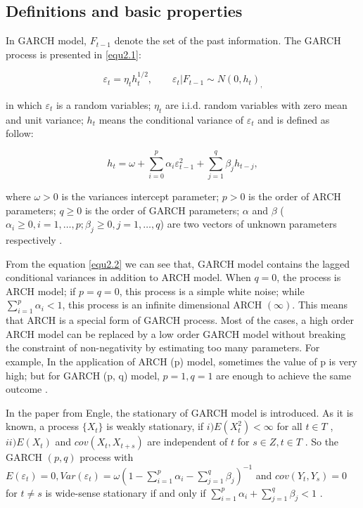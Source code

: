 \subsection{Definitions and basic properties}
In GARCH model, $F_{t-1}$ denote the set of the past information. The GARCH process is presented in \ref{equ2.1}:

\begin{equation} 
\label{equ2.1}
	\varepsilon_t =  \eta_t h_t^{1/2},    \qquad    \varepsilon_{t}|F_{t-1}\sim N(0,h_{t})_,
 \end{equation} 
 
in which $\varepsilon_t$ is a random variables; $\eta_t$ are i.i.d. random  variables with zero mean and unit variance; $h_{t}$ means the conditional variance of $\varepsilon_{t}$ and is defined as follow:

\begin{equation}
\label{equ2.2} 
h_t = \omega + \sum_{i=0}^p \alpha_i \varepsilon_{t-1}^2 + \sum_{j=1}^q\beta_j h_{t-j},
\end{equation} 

where $\omega>0$ is the variances intercept parameter; $p>0$ is the order of ARCH parameters; $q \geq 0$ is the order of GARCH parameters; $\alpha$ and $\beta$ ( $ \alpha_i \geq 0, i=1, \dots ,p; \beta_j \geq 0, j=1,\dots,q$) are two vectors of unknown parameters respectively \citep{Bollerslev1986}.

From the equation \ref{equ2.2} we can see that, GARCH model contains the lagged conditional variances in addition to ARCH model. When  $q=0$, the process is ARCH model; if $ p = q = 0$, this process is a simple white noise; while $\sum_{i=1}^p\alpha_i <1$, this process is an infinite dimensional ARCH  $(\infty)$. This means that ARCH is a special form of GARCH process. Most of the cases, a high order ARCH model can be replaced by a low order GARCH model without breaking the constraint of non-negativity by estimating too many parameters. For example, In the application of ARCH (p) model, sometimes the value of p is very high; but for GARCH (p, q) model, $p=1, q=1$ are enough to achieve the same outcome \citep{Engle1986}.


In the paper from Engle, the stationary of GARCH model is introduced. As it is known, a process $\lbrace X_{t} \rbrace$  is weakly stationary,  if $i) E(X_{t}^{2}) < \infty$  for all  $t \in T$ ,$ ii) E(X_{t})$  and $cov(X_t,X_{t+s})$  are independent of $t$ for $s \in Z, t \in T$ \citep{Bougerol1992}. So the GARCH $(p,q)$ process with $E\left( \varepsilon_t \right) =0, Var(\varepsilon_t) = \omega(1-  \sum_{i=1}^p\alpha_i - \sum_{j=1}^q\beta_j )^{-1}$ and $cov(Y_t,Y_s)=0$ for $t \neq s$ is wide-sense stationary if and only if $\sum_{i=1}^p\alpha_i + \sum_{j=1}^q\beta_j < 1 $ \citep{Bollerslev1986}.

